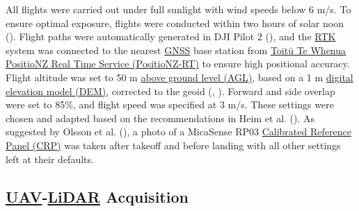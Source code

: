\documentclass[
]{scrreprt}
\begin{document}
All flights were carried out under full sunlight with wind speeds below
6 m/s. To ensure optimal exposure, flights were conducted within two
hours of solar noon (). Flight paths were automatically generated in DJI Pilot 2
(), and the
\hyperref[acronyms_RTK]{RTK} system was connected to the nearest
\hyperref[acronyms_GNSS]{GNSS} base station from
\hyperref[acronyms_PositioNZ]{Toitū Te Whenua PositioNZ Real Time
Service (PositioNZ-RT)} to ensure high positional accuracy. Flight
altitude was set to 50 m \hyperref[acronyms_AGL]{above ground
level (AGL)}, based on a 1 m \hyperref[acronyms_DEM]{digital elevation
model (DEM)}, corrected to the geoid
(,
). Forward and side overlap were
set to 85\%, and flight speed was specified at 3 m/s. These settings
were chosen and adapted based on the recommendations in Heim et al.
(). As suggested by
Olsson et al. (), a
photo of a MicaSense RP03 \hyperref[acronyms_CRP]{Calibrated Reference
Panel (CRP)} was taken after takeoff and before landing with all other
settings left at their defaults.

\subsection{\texorpdfstring{\hyperref[acronyms_UAV]{UAV}-\hyperref[acronyms_LiDAR]{LiDAR}
Acquisition}{UAV-LiDAR Acquisition}}\label{acquisition}
\end{document}
